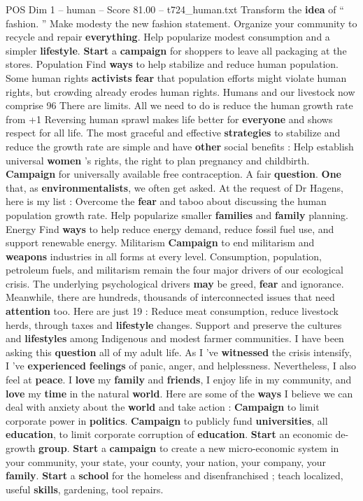 \begin{textsample}{POS Dim 1 – human – Score 81.00 – t724\_human.txt}
Transform the \textbf{idea} of “ fashion. ” Make modesty the new fashion statement.
Organize your community to recycle and repair \textbf{everything}.
Help popularize modest consumption and a simpler \textbf{lifestyle}. \textbf{Start} a \textbf{campaign} for shoppers to leave all packaging at the stores.
Population Find \textbf{ways} to help stabilize and reduce human population.
Some human rights \textbf{activists} \textbf{fear} that population efforts might violate human rights, but crowding already erodes human rights.
Humans and our livestock now comprise 96 %
There are limits.
All we need to do is reduce the human growth rate from +1 %
Reversing human sprawl makes life better for \textbf{everyone} and shows respect for all life.
The most graceful and effective \textbf{strategies} to stabilize and reduce the growth rate are simple and have \textbf{other} social benefits : Help establish universal \textbf{women} ’s rights, the right to plan pregnancy and childbirth. \textbf{Campaign} for universally available free contraception.
A fair \textbf{question}. \textbf{One} that, as \textbf{environmentalists}, we often get asked.
At the request of Dr Hagens, here is my list : Overcome the \textbf{fear} and taboo about discussing the human population growth rate.
Help popularize smaller \textbf{families} and \textbf{family} planning.
Energy Find \textbf{ways} to help reduce energy demand, reduce fossil fuel use, and support renewable energy.
Militarism \textbf{Campaign} to end militarism and \textbf{weapons} industries in all forms at every level.
Consumption, population, petroleum fuels, and militarism remain the four major drivers of our ecological crisis.
The underlying psychological drivers \textbf{may} be greed, \textbf{fear} and ignorance.
Meanwhile, there are hundreds, thousands of interconnected issues that need \textbf{attention} too.
Here are just 19 : Reduce meat consumption, reduce livestock herds, through taxes and \textbf{lifestyle} changes.
Support and preserve the cultures and \textbf{lifestyles} among Indigenous and modest farmer communities.
I have been asking this \textbf{question} all of my adult life.
As I ’ve \textbf{witnessed} the crisis intensify, I ’ve \textbf{experienced} \textbf{feelings} of panic, anger, and helplessness.
Nevertheless, I also feel at \textbf{peace}.
I \textbf{love} my \textbf{family} and \textbf{friends}, I enjoy life in my community, and \textbf{love} my \textbf{time} in the natural \textbf{world}.
Here are some of the \textbf{ways} I believe we can deal with anxiety about the \textbf{world} and take action : \textbf{Campaign} to limit corporate power in \textbf{politics}. \textbf{Campaign} to publicly fund \textbf{universities}, all \textbf{education}, to limit corporate corruption of \textbf{education}. \textbf{Start} an economic de-growth \textbf{group}. \textbf{Start} a \textbf{campaign} to create a new micro-economic system in your community, your state, your county, your nation, your company, your \textbf{family}. \textbf{Start} a \textbf{school} for the homeless and disenfranchised ; teach localized, useful \textbf{skills}, gardening, tool repairs.

\end{textsample}
